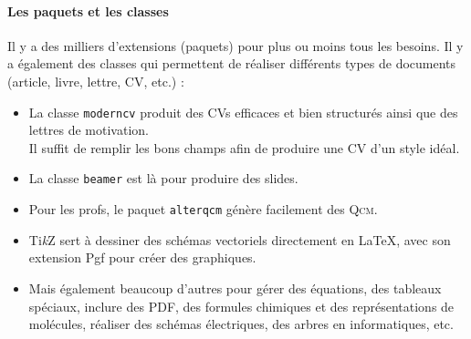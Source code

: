\documentclass{../fiche}
\begin{document}
\paragraph{Les paquets et les classes}
Il y a des milliers d'extensions (paquets) pour plus ou moins tous les besoins. Il y a également des classes qui permettent de réaliser différents types de documents (article, livre, lettre, CV, etc.) :
\begin{itemize}
	\item La classe \texttt{moderncv} produit des CVs efficaces et bien structurés ainsi que des lettres de motivation.\\ Il suffit de remplir les bons champs afin de produire une CV d'un style idéal.
	\item La classe \texttt{beamer} est là pour produire des slides.
	\item Pour les profs, le paquet \texttt{alterqcm} génère facilement des \textsc{Qcm}.
	\item Ti\textit{k}Z sert à dessiner des schémas vectoriels directement en \LaTeX{}, avec son extension Pgf pour créer des graphiques.
	\item Mais également beaucoup d'autres pour gérer des équations, des tableaux spéciaux, inclure des PDF, des formules chimiques et des représentations de molécules, réaliser des schémas électriques, des arbres en informatiques, etc.
\end{itemize}
\end{document}
